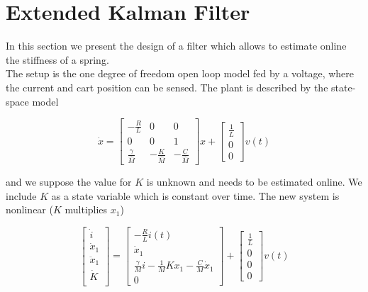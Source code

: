 \section{Extended Kalman Filter}
In this section we present the design of a filter which allows to estimate online the stiffness of a spring.\\

The setup is the one degree of freedom open loop model fed by a voltage, where the current and cart position can be sensed. The plant is described by the state-space model

\begin{equation}
	\dot{x}=\begin{bmatrix}
		-\frac{R}{L} &0 & 0 \\
		0 & 0 & 1 \\ 
		\frac{\gamma}{\hat{M}} & -\frac{K}{\hat{M}} & -\frac{C}{\hat{M}}
	\end{bmatrix}
	x
	+
	\begin{bmatrix}\frac{1}{L} \\ 0 \\ 0\end{bmatrix} v(t)
\end{equation}

and we suppose the value for $K$ is unknown and needs to be estimated online. We include $K$ as a state variable which is constant over time. The new system is nonlinear ($K$ multiplies $x_1$)

\begin{equation}
		\begin{bmatrix}
			\dot{i} \\
			\dot{x}_1 \\
			\ddot{x}_1 \\
			\dot{K} \\
		\end{bmatrix}
		= 
		\begin{bmatrix}
			-\frac{R}{L} i(t) \\
			\dot{x}_1 \\
			\frac{\gamma}{M} i - \frac{1}{M} Kx_1 - \frac{C}{M} \dot{x}_1 \\
			0
		\end{bmatrix}
		+
		\begin{bmatrix}\frac{1}{L} \\ 0 \\ 0 \\ 0 \end{bmatrix} v(t)
\end{equation}

